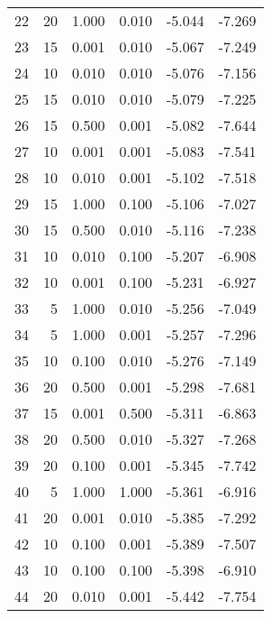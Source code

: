\begin{tabular}{rrrrrr}
    22 &        20 &  1.000 & 0.010 &                 -5.044 &      -7.269 \\
    23 &        15 &  0.001 & 0.010 &                 -5.067 &      -7.249 \\
    24 &        10 &  0.010 & 0.010 &                 -5.076 &      -7.156 \\
    25 &        15 &  0.010 & 0.010 &                 -5.079 &      -7.225 \\
    26 &        15 &  0.500 & 0.001 &                 -5.082 &      -7.644 \\
    27 &        10 &  0.001 & 0.001 &                 -5.083 &      -7.541 \\
    28 &        10 &  0.010 & 0.001 &                 -5.102 &      -7.518 \\
    29 &        15 &  1.000 & 0.100 &                 -5.106 &      -7.027 \\
    30 &        15 &  0.500 & 0.010 &                 -5.116 &      -7.238 \\
    31 &        10 &  0.010 & 0.100 &                 -5.207 &      -6.908 \\
    32 &        10 &  0.001 & 0.100 &                 -5.231 &      -6.927 \\
    33 &         5 &  1.000 & 0.010 &                 -5.256 &      -7.049 \\
    34 &         5 &  1.000 & 0.001 &                 -5.257 &      -7.296 \\
    35 &        10 &  0.100 & 0.010 &                 -5.276 &      -7.149 \\
    36 &        20 &  0.500 & 0.001 &                 -5.298 &      -7.681 \\
    37 &        15 &  0.001 & 0.500 &                 -5.311 &      -6.863 \\
    38 &        20 &  0.500 & 0.010 &                 -5.327 &      -7.268 \\
    39 &        20 &  0.100 & 0.001 &                 -5.345 &      -7.742 \\
    40 &         5 &  1.000 & 1.000 &                 -5.361 &      -6.916 \\
    41 &        20 &  0.001 & 0.010 &                 -5.385 &      -7.292 \\
    42 &        10 &  0.100 & 0.001 &                 -5.389 &      -7.507 \\
    43 &        10 &  0.100 & 0.100 &                 -5.398 &      -6.910 \\
    44 &        20 &  0.010 & 0.001 &                 -5.442 &      -7.754 \\

\end{tabular}
